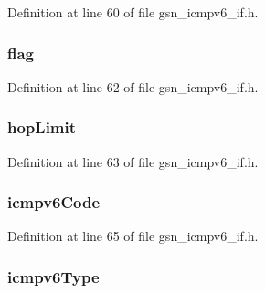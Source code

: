 Definition at line 60 of file gsn\_\-icmpv6\_\-if.h.

\hypertarget{a00202_a4da68cacc97065c362b6249ac3890deb}{
\subsubsection[{flag}]{ {\bf flag}}}
\label{a00202_a4da68cacc97065c362b6249ac3890deb}


Definition at line 62 of file gsn\_\-icmpv6\_\-if.h.

\hypertarget{a00202_a8e2cd715a8e99f22a1460c690fa67c3e}{
\subsubsection[{hopLimit}]{ {\bf hopLimit}}}
\label{a00202_a8e2cd715a8e99f22a1460c690fa67c3e}


Definition at line 63 of file gsn\_\-icmpv6\_\-if.h.

\hypertarget{a00202_a995a5a55b81b8e6e2a21f3ea06bbc150}{
\subsubsection[{icmpv6Code}]{ {\bf icmpv6Code}}}
\label{a00202_a995a5a55b81b8e6e2a21f3ea06bbc150}


Definition at line 65 of file gsn\_\-icmpv6\_\-if.h.

\hypertarget{a00202_a0c56c215ef0c46d3adb96bc1e90e0078}{
\subsubsection[{icmpv6Type}]{ {\bf icmpv6Type}}}
\label{a00202_a0c56c215ef0c46d3adb96bc1e90e0078}


